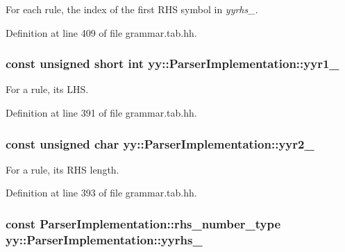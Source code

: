 For each rule, the index of the first RHS symbol in {\itshape yyrhs\_\-\/}. 



Definition at line 409 of file grammar.tab.hh.

\hypertarget{classyy_1_1_parser_implementation_aa661efe49894e54f8e0640ca5081174e}{
\subsubsection[{yyr1\_\-}]{\setlength{\rightskip}{0pt plus 5cm}const unsigned short int {\bf yy::ParserImplementation::yyr1\_\-}}}
\label{classyy_1_1_parser_implementation_aa661efe49894e54f8e0640ca5081174e}


For a rule, its LHS. 



Definition at line 391 of file grammar.tab.hh.

\hypertarget{classyy_1_1_parser_implementation_aae8701b08b3bcbe1a1aecf3c49f22cc1}{
\subsubsection[{yyr2\_\-}]{\setlength{\rightskip}{0pt plus 5cm}const unsigned char {\bf yy::ParserImplementation::yyr2\_\-}}}
\label{classyy_1_1_parser_implementation_aae8701b08b3bcbe1a1aecf3c49f22cc1}


For a rule, its RHS length. 



Definition at line 393 of file grammar.tab.hh.

\hypertarget{classyy_1_1_parser_implementation_a6e4c8b6a53433c156356fb91fc929e19}{
\subsubsection[{yyrhs\_\-}]{\setlength{\rightskip}{0pt plus 5cm}const {\bf ParserImplementation::rhs\_\-number\_\-type} {\bf yy::ParserImplementation::yyrhs\_\-}}}
\label{classyy_1_1_parser_implementation_a6e4c8b6a53433c156356fb91fc929e19}


